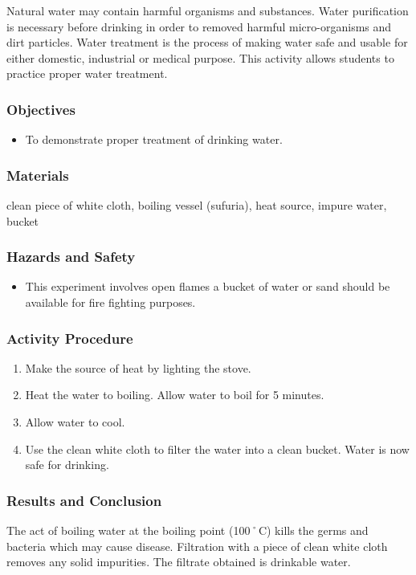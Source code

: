 Natural water may contain harmful organisms and substances. Water purification is necessary before drinking in order to removed harmful micro-organisms and dirt particles. Water treatment is the process of making water safe and usable for either domestic, industrial or medical purpose. This activity allows students to practice proper water treatment.



\subsubsection*{Objectives}
\begin{itemize}
\item{To demonstrate proper treatment of drinking water.}
\end{itemize}

\subsubsection*{Materials}
clean piece of white cloth, boiling vessel (sufuria), heat source, impure water, bucket

\subsubsection*{Hazards and Safety}
\begin{itemize}
\item{This experiment involves open flames a bucket of water or sand should be available for fire fighting purposes.}
\end{itemize}


\subsubsection*{Activity Procedure}
\begin{enumerate}
\item{Make the source of heat by lighting the stove.}
\item{Heat the water to boiling. Allow water to boil for 5 minutes.}
\item{Allow water to cool.}
\item{Use the clean white cloth to filter the water into a clean bucket. Water is now safe for drinking.}
\end{enumerate}

\subsubsection*{Results and Conclusion}
The act of boiling water at the boiling point (100˚C) kills the germs and bacteria which may cause disease. Filtration with a piece of clean white cloth removes any solid impurities. The filtrate obtained is drinkable water.

